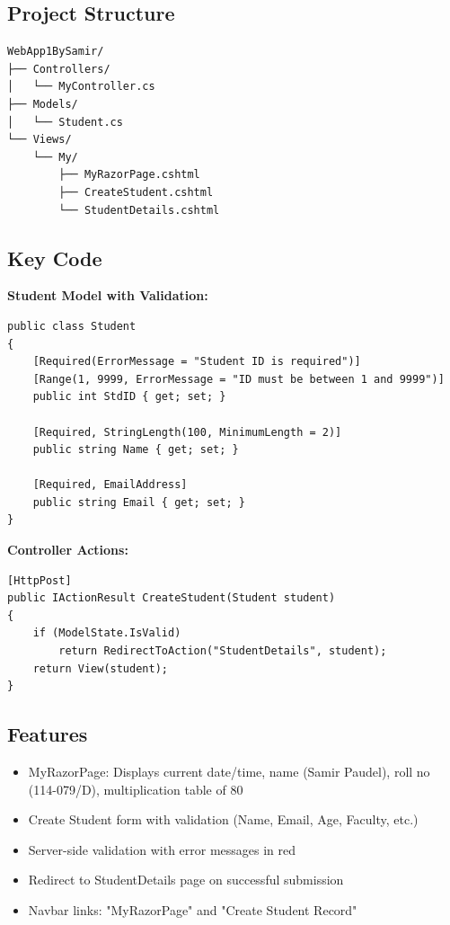 \documentclass[10pt,a4paper]{article}
\begin{document}
\subsection*{Project Structure}
\begin{verbatim}
WebApp1BySamir/
├── Controllers/
│   └── MyController.cs
├── Models/
│   └── Student.cs
└── Views/
    └── My/
        ├── MyRazorPage.cshtml
        ├── CreateStudent.cshtml
        └── StudentDetails.cshtml
\end{verbatim}

\subsection*{Key Code}

\textbf{Student Model with Validation:}
\begin{lstlisting}[basicstyle=\ttfamily\tiny]
public class Student
{
    [Required(ErrorMessage = "Student ID is required")]
    [Range(1, 9999, ErrorMessage = "ID must be between 1 and 9999")]
    public int StdID { get; set; }

    [Required, StringLength(100, MinimumLength = 2)]
    public string Name { get; set; }

    [Required, EmailAddress]
    public string Email { get; set; }
}
\end{lstlisting}

\textbf{Controller Actions:}
\begin{lstlisting}[basicstyle=\ttfamily\tiny]
[HttpPost]
public IActionResult CreateStudent(Student student)
{
    if (ModelState.IsValid)
        return RedirectToAction("StudentDetails", student);
    return View(student);
}
\end{lstlisting}

\subsection*{Features}
\begin{itemize}
    \item MyRazorPage: Displays current date/time, name (Samir Paudel), roll no (114-079/D), multiplication table of 80
    \item Create Student form with validation (Name, Email, Age, Faculty, etc.)
    \item Server-side validation with error messages in red
    \item Redirect to StudentDetails page on successful submission
    \item Navbar links: "MyRazorPage" and "Create Student Record"
\end{itemize}
\end{document}
